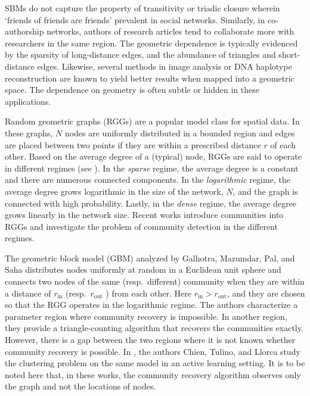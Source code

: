 \documentclass[letterpaper,11pt]{article}
\theoremstyle{definition}
\numberwithin{equation}{section}
\theoremstyle{definition}
\numberwithin{equation}{section}
\theoremstyle{thmstyletwo}%
\begin{document}
SBMs do not capture the property of transitivity or triadic closure wherein `friends of friends are friends' prevalent in social networks. Similarly, in co-authorship networks, authors of research articles tend to collaborate more with researchers in the same region. The geometric dependence is typically evidenced by the sparsity of long-distance edges, and the abundance of triangles and short-distance edges. Likewise, several methods in image analysis \cite{gao2019geometric} or DNA haplotype reconstruction \cite{sankararaman2020comhapdet} are known to yield better results when mapped into a geometric space. The dependence on geometry is often subtle or hidden in these applications.

Random geometric graphs (RGGs) are a popular model class for spatial data. In these graphs, $N$ nodes are uniformly distributed in a bounded region and edges are placed between two points if they are within a prescribed distance $r$ of each other. Based on the average degree of a (typical) node, RGGs are said to operate in different regimes (see \cite[Chapter 13]{Penrose_2003}). In the \emph{sparse} regime, the average degree is a constant and there are numerous connected components. In the \emph{logarithmic} regime, the average degree grows logarithmic in the size of the network, $N$, and the graph is connected with high probability. Lastly, in the \emph{dense} regime, the average degree grows linearly in the network size. Recent works \cite{abbe2021community,galhotra2023community,avrachenkov2021higher} introduce communities into RGGs and investigate the problem of community detection in the different regimes.

The geometric block model (GBM) analyzed by Galhotra, Mazumdar, Pal, and Saha \cite{galhotra2023community} distributes nodes uniformly at random in a Euclidean unit sphere and connects two nodes of the same (resp.\ different) community when they are within a distance of $r_{\text{in}}$ (resp.\ $r_{\text{out}}$ ) from each other.  Here $r_{\text{in}}>r_{\text{out}}$, and they are chosen so that the RGG operates in the logarithmic regime.
The authors characterize a parameter region where community recovery is impossible. In another region, they provide a triangle-counting algorithm that recovers the communities exactly. However, there is a gap between the two regions where it is not known whether community recovery is possible. In \cite{chien2020active}, the authors Chien, Tulino, and Llorca study the clustering problem on the same model in an active learning setting. It is to be noted here that, in these works, the community recovery algorithm observes only the graph and not the locations of nodes.
\end{document}
